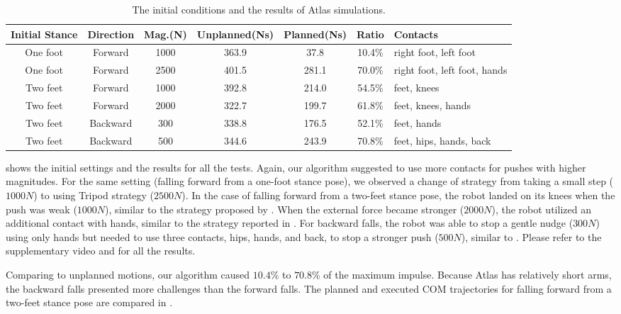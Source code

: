 \begin{table}
\scriptsize
\center
{
\caption{The initial conditions and the results of Atlas simulations.}
\begin{tabular}{c c c|c c c| l }
\label{tab:falling_atlas_results}
\\ \hline 
Initial Stance & Direction & Mag.(N) & Unplanned(Ns) & Planned(Ns) & Ratio & Contacts \\ \hline
One foot & Forward & 1000 & 363.9 & 37.8 & 10.4\% & right foot,  left foot \\ \hline
One foot & Forward & 2500 & 401.5 & 281.1 & 70.0\% & right foot,  left foot, hands \\ \hline
Two feet & Forward & 1000 & 392.8 & 214.0 & 54.5\% & feet, knees \\ \hline
Two feet & Forward & 2000 & 322.7 & 199.7 & 61.8\% & feet, knees, hands \\ \hline
Two feet & Backward & 300 & 338.8 & 176.5 & 52.1\% & feet, hands \\ \hline
Two feet & Backward & 500 & 344.6 & 243.9 & 70.8\% & feet, hips, hands, back \\ \hline
\end{tabular}
}
\end{table}

 shows the initial settings and the results for all
the tests. Again, our algorithm suggested to use more contacts for
pushes with higher magnitudes. For the same setting (falling forward
from a one-foot stance pose), we observed a change of strategy from taking a
small step ($1000N$) to using Tripod strategy ($2500N$).  In the case
of falling forward from a two-feet stance pose, the robot landed on its knees
when the push was weak ($1000N$), similar to the strategy proposed by
\cite{Fujiwara:2004:SKL}.  When the external force became stronger
($2000N$), the robot utilized an additional contact with hands,
similar to the strategy reported in
\cite{Fujiwara:2007:OPF,Ogata:2008:RSG}. For backward falls, the robot
was able to stop a gentle nudge ($300N$) using only hands but needed
to use three contacts, hips, hands, and back, to stop a stronger push
($500N$), similar to \cite{Fujiwara:2002:UFM}.  Please refer to the
supplementary video and  for all the results.

Comparing to unplanned motions, our algorithm caused $10.4\%$ to
$70.8\%$ of the maximum impulse. Because Atlas has relatively short
arms, the backward falls presented more challenges than the forward
falls. The planned and executed COM trajectories for falling forward
from a two-feet stance pose are compared in .

